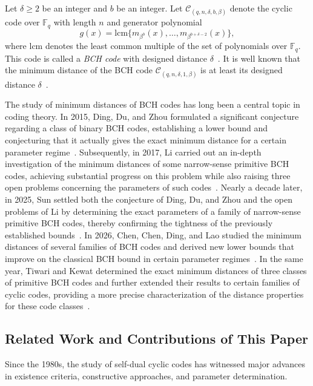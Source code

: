 \documentclass[10pt,a4paper]{amsart}
\begin{document}
Let $\delta\ge 2$ be an integer and $b$ be an integer. Let $\mathcal{C}_{(q,n,\delta,b,\beta)}$ denote the cyclic code over $\mathbb{F}_q$ with length $n$ and generator polynomial \[g(x)=\text{lcm}\{m_{\beta^b}(x),\dots,m_{\beta^{b+\delta-2}}(x)\},\]
where $\text{lcm}$ denotes the least common multiple of the set of polynomials over $\mathbb{F}_q$.  This code is called a \textit{BCH code} with designed distance $\delta$~\cite{huffman2003fundamentals}. It is well known that the minimum distance of the BCH code $\mathcal{C}_{(q,n,\delta,1,\beta)}$ is at least its designed distance $\delta$~\cite{Blahut2003Algebraic}. 

The study of minimum distances of BCH codes has long been a central topic in coding theory. In 2015, Ding, Du, and Zhou formulated a significant conjecture regarding a class of binary BCH codes, establishing a lower bound and conjecturing that it actually gives the exact minimum distance for a certain parameter regime~\cite{7056532}. Subsequently, in 2017, Li carried out an in-depth investigation of the minimum distances of some narrow-sense primitive BCH codes, achieving substantial progress on this problem while also raising three open problems concerning the parameters of such codes~\cite{2017The}. Nearly a decade later, in 2025, Sun settled both the conjecture of Ding, Du, and Zhou and the open problems of Li by determining the exact parameters of a family of narrow-sense primitive BCH codes, thereby confirming the tightness of the previously established bounds~\cite{Sun2025}. In 2026, Chen, Chen, Ding, and Lao studied the minimum distances of several families of BCH codes and derived new lower bounds that improve on the classical BCH bound in certain parameter regimes~\cite{11505961}. In the same year, Tiwari and Kewat determined the exact minimum distances of three classes of primitive BCH codes and further extended their results to certain families of cyclic codes, providing a more precise characterization of the distance properties for these code classes~\cite{11428251}.

\subsection{Related Work and Contributions of This Paper}
Since the 1980s, the study of self-dual cyclic codes has witnessed major advances in existence criteria, constructive approaches, and parameter determination.
\end{document}
